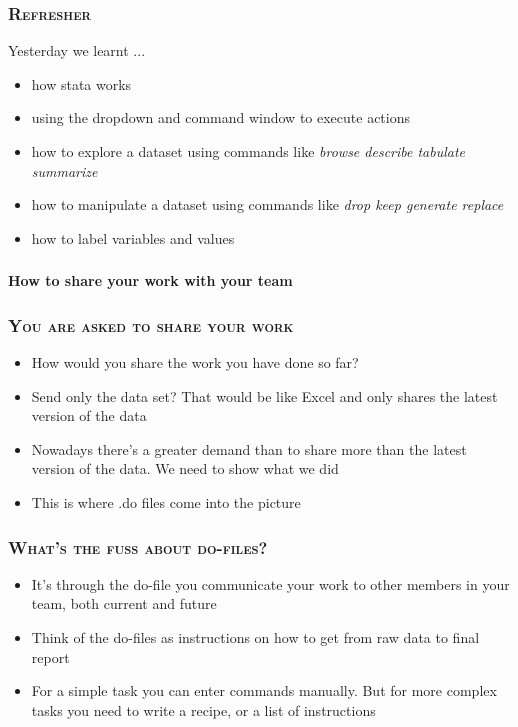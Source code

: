 \documentclass[10pt]{beamer}
\begin{document}
	
	\begin{frame}
		\frametitle{\textsc{Refresher}}
		Yesterday we learnt ...
		\begin{itemize}
			\item how stata works
			\item using the dropdown and command window to execute actions
			\item how to explore a dataset using commands like \textit{browse describe tabulate summarize}
			\item how to manipulate a dataset using commands like \textit{drop keep generate replace}
			\item how to label variables and values
		\end{itemize}
	\end{frame}
	
	\begin{frame}
		\frametitle{\textsc{}}

		\begin{center}
			\Large  \textbf{How to share your work with your team}
		\end{center}
	\end{frame}

	\begin{frame}
		\frametitle{\textsc{You are asked to share your work}}

		\begin{itemize}
			\item How would you share the work you have done so far?
			\item Send only the data set? That would be like Excel and only shares the latest version of the data
			\item Nowadays there's a greater demand than to share more than the latest version of the data. We need to show what we did
			\item This is where .do files come into the picture

		\end{itemize}
	\end{frame}

		\begin{frame}
			\frametitle{\textsc{What's the fuss about do-files?}}
			
			\begin{itemize}
				\item It's through the do-file you communicate your work to other members in your team, both current and future
				\item Think of the do-files as instructions on how to get from raw data to final report
				\item For a simple task you can enter commands manually. But for more complex tasks you need to write a recipe, or a list of instructions
				
				\end{itemize}
			\end{frame}
			
\end{document}
